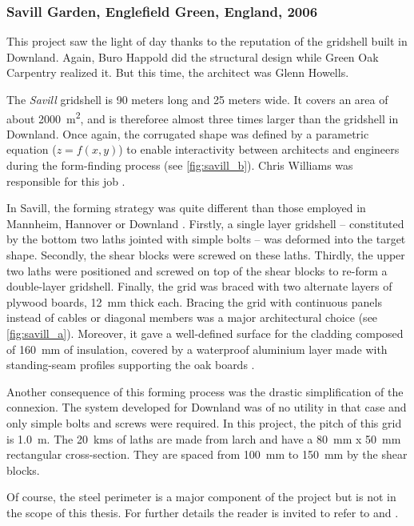 \subsubsection{Savill Garden, Englefield Green, England, 2006}

This project saw the light of day thanks to the reputation of the gridshell built in Downland. Again, Buro Happold did the structural design while Green Oak Carpentry realized it. But this time, the architect was Glenn Howells.

The \emph{Savill} gridshell is 90 meters long and 25 meters wide. It covers an area of about \SI{2000}{m^2}, and is thereforee almost three times larger than the gridshell in Downland. Once again, the corrugated shape was defined by a parametric equation ($z = f(x,y)$) to enable interactivity between architects and engineers during the form-finding process (see \cref{fig:savill_b}). Chris Williams was responsible for this job \cite{Harris2008}.

In Savill, the forming strategy was quite different than those employed in Mannheim, Hannover or Downland \cite{Harris2008}. Firstly, a single layer gridshell -- constituted by the bottom two laths jointed with simple bolts -- was deformed into the target shape. Secondly, the shear blocks were screwed on these laths. Thirdly, the upper two laths were positioned and screwed on top of the shear blocks to re-form a double-layer gridshell. Finally, the grid was braced with two alternate layers of plywood boards, \SI{12}{mm} thick each. Bracing the grid with continuous panels instead of cables or diagonal members was a major architectural choice (see \cref{fig:savill_a}). Moreover, it gave a well-defined surface for the cladding composed of \SI{160}{mm} of insulation, covered by a waterproof aluminium layer made with standing-seam profiles supporting the oak boards \cite{Trada2006}.

Another consequence of this forming process was the drastic simplification of the connexion. The system developed for Downland was of no utility in that case and only simple bolts and screws were required. In this project, the pitch of this grid is \SI{1.0}{m}. The \SI{20}{kms} of laths are made from larch and have a \SI{80}{mm} x \SI{50}{mm} rectangular cross-section. They are spaced from \SI{100}{mm} to \SI{150}{mm} by the shear blocks.

Of course, the steel perimeter is a major component of the project but is not in the scope of this thesis. For further details the reader is invited to refer to \citet{Harris2008} and \citet{Trada2006}. 

